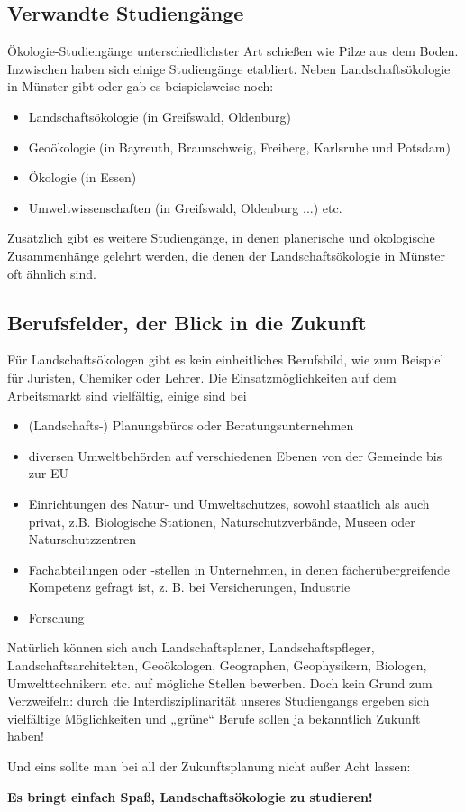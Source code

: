 \subsection*{Verwandte Studiengänge}
Ökologie-Studiengänge unterschiedlichster Art schießen wie Pilze aus dem Boden. Inzwischen haben sich einige Studiengänge etabliert. Neben Landschaftsökologie in Münster gibt oder gab es beispielsweise noch:
\begin{itemize}
  \item Landschaftsökologie (in Greifswald, Oldenburg)
  \item Geoökologie (in Bayreuth, Braunschweig, Freiberg, Karlsruhe und Potsdam)
  \item Ökologie (in Essen)
  \item Umweltwissenschaften (in Greifswald, Oldenburg ...) etc.
\end{itemize}
Zusätzlich gibt es weitere Studiengänge, in denen planerische und ökologische Zusammenhänge gelehrt werden, die denen der Landschaftsökologie in Münster oft ähnlich sind. 

\subsection*{Berufsfelder, der Blick in die Zukunft}
Für Landschaftsökologen gibt es kein einheitliches Berufsbild, wie zum Beispiel für Juristen, Chemiker oder Lehrer. Die Einsatzmöglichkeiten auf dem Arbeitsmarkt sind vielfältig, einige sind bei
\begin{itemize}
  \item (Landschafts-) Planungsbüros oder Beratungsunternehmen
  \item diversen Umweltbehörden auf verschiedenen Ebenen von der Gemeinde bis zur EU
  \item Einrichtungen des Natur- und Umweltschutzes, sowohl staatlich als auch privat, z.B. Biologische Stationen, Naturschutzverbände, Museen oder Naturschutzzentren
  \item Fachabteilungen oder -stellen in Unternehmen, in denen fächerübergreifende Kompetenz gefragt ist, z. B. bei Versicherungen, Industrie
  \item{Forschung}
\end{itemize}
Natürlich können sich auch Landschaftsplaner, Landschaftspfleger, Landschaftsarchitekten, Geoökologen, Geographen, Geophysikern, Biologen, Umwelttechnikern etc. auf mögliche Stellen bewerben. Doch kein Grund zum Verzweifeln: durch die Interdisziplinarität unseres Studiengangs ergeben sich vielfältige Möglichkeiten und „grüne“ Berufe sollen ja bekanntlich Zukunft haben!

Und eins sollte man bei all der Zukunftsplanung nicht außer Acht lassen: 

\textbf{Es bringt einfach Spaß, Landschaftsökologie zu studieren!}
